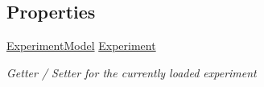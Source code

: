 \subsection*{Properties}
\begin{DoxyCompactItemize}
\item 
\hyperlink{class_web_analyzer_1_1_models_1_1_base_1_1_experiment_model}{Experiment\+Model} \hyperlink{class_web_analyzer_1_1_u_i_1_1_interaction_objects_1_1_analysis_export_control_a951604e49f2e9dfe33ec3cb1d8fdc4fa}{Experiment}
\begin{DoxyCompactList}\small\item\em Getter / Setter for the currently loaded experiment \end{DoxyCompactList}\end{DoxyCompactItemize}
